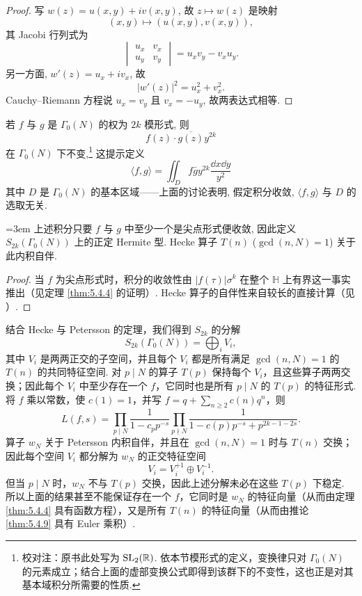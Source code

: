 \begin{proof}
写 $w(z) = u(x, y) + iv(x, y)$, 故 $z\mapsto w(z)$ 是映射
\[
(x, y)\mapsto(u(x, y), v(x, y)),
\]
其 Jacobi 行列式为
\[
\begin{vmatrix}u_x & v_x\\ u_y & v_y\end{vmatrix} = u_xv_y - v_xu_y.
\]
另一方面, $w'(z) = u_x + iv_x$, 故
\[
|w'(z)|^2 = u_x^2 + v_x^2.
\]
Cauchy--Riemann 方程说 $u_x = v_y$ 且 $v_x = -u_y$, 故两表达式相等.
\end{proof}

若 $f$ 与 $g$ 是 $\Gamma_0(N)$ 的权为 $2k$ 模形式, 则
\[
f(z)\cdot\overline{g(z)}y^{2k}
\]
在 $\Gamma_0(N)$ 下不变,\footnote{校对注：原书此处写为 $\operatorname{SL}_2(\mathbb{R})$. 依本节模形式的定义，变换律只对 $\Gamma_0(N)$ 的元素成立；结合上面的虚部变换公式即得到该群下的不变性，这也正是对其基本域积分所需要的性质.} 这提示定义
\[
\langle f, g\rangle = \iint_D f\bar{g}y^{2k}\frac{\dd x\dd y}{y^2}
\]
其中 $D$ 是 $\Gamma_0(N)$ 的基本区域——上面的讨论表明, 假定积分收敛, $\langle f, g\rangle$ 与 $D$ 的选取无关.

\begin{theorem}[Petersson] \label{thm:5.4.19}
{\emergencystretch=3em 上述积分只要 $f$ 与 $g$ 中至少一个是尖点形式便收敛, 因此定义 $S_{2k}(\Gamma_0(N))$ 上的正定 Hermite 型. Hecke 算子 $T(n)$ ($\gcd(n, N) = 1$) 关于此内积自伴.\par}
\end{theorem}

\begin{proof}
当 $f$ 为尖点形式时，积分的收敛性由 $|f(\tau)|\sigma^k$ 在整个 $\mathbb{H}$ 上有界这一事实推出（见定理 \ref{thm:5.4.4} 的证明）. Hecke 算子的自伴性来自较长的直接计算（见 \cite[8.22, 9.18]{knapp1992}）.
\end{proof}

结合 Hecke 与 Petersson 的定理，我们得到 $S_{2k}$ 的分解
\[
S_{2k}(\Gamma_0(N))=\bigoplus_i V_i,
\]
其中 $V_i$ 是两两正交的子空间，并且每个 $V_i$ 都是所有满足 $\gcd(n,N)=1$ 的 $T(n)$ 的共同特征空间. 对 $p\mid N$ 的算子 $T(p)$ 保持每个 $V_i$，且这些算子两两交换；因此每个 $V_i$ 中至少存在一个 $f$，它同时也是所有 $p\mid N$ 的 $T(p)$ 的特征形式. 将 $f$ 乘以常数，使 $c(1)=1$，并写 $f=q+\sum_{n\ge 2}c(n)q^n$，则
\[
L(f,s)=\prod_{p\mid N}\frac{1}{1-c_pp^{-s}}
\prod_{p\nmid N}\frac{1}{1-c(p)p^{-s}+p^{2k-1-2s}}.
\]
算子 $w_N$ 关于 Petersson 内积自伴，并且在 $\gcd(n,N)=1$ 时与 $T(n)$ 交换；因此每个空间 $V_i$ 都分解为 $w_N$ 的正交特征空间
\[
V_i=V_i^{+1}\oplus V_i^{-1}.
\]
但当 $p\mid N$ 时，$w_N$ 不与 $T(p)$ 交换，因此上述分解未必在这些 $T(p)$ 下稳定. 所以上面的结果甚至不能保证存在一个 $f$，它同时是 $w_N$ 的特征向量（从而由定理 \ref{thm:5.4.4} 具有函数方程），又是所有 $T(n)$ 的特征向量（从而由推论 \ref{thm:5.4.9} 具有 Euler 乘积）.


